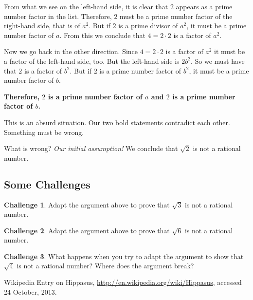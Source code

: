 \documentclass[12pt,letterpaper]{article}
\theoremstyle{definition}
\newtheorem*{challenge}{Challenge}
\begin{document}
From what we see on the left-hand side, it is clear that $2$ appears as a prime number factor in the list.
Therefore, $2$ must be a prime number factor of the right-hand side, that is of $a^2$.
But if $2$ is a prime divisor of $a^2$, it must be a prime number factor of $a$.
From this we conclude that $4 = 2\cdot 2$ is a factor of $a^2$.

Now we go back in the other direction.
Since $4 = 2\cdot 2$ is a factor of $a^2$ it must be a factor of the left-hand side, too.
But the left-hand side is $2 b^2$.
So we must have that $2$ is a factor of $b^2$.
But if $2$ is a prime number factor of $b^2$, it must be a prime number factor of $b$.

\textbf{Therefore, $2$ is a prime number factor of $a$ and $2$ is a prime number factor of $b$.}

This is an absurd situation.
Our two bold statements contradict each other.
Something must be wrong.

What is wrong?
\textit{Our initial assumption!}
We conclude that $\sqrt{2}$ is not a rational number.


\subsection*{Some Challenges}

\begin{challenge}
Adapt the argument above to prove that $\sqrt{3}$ is not a rational number.
\end{challenge}

\begin{challenge}
Adapt the argument above to prove that $\sqrt{6}$ is not a rational number.
\end{challenge}

\begin{challenge}
What happens when you try to adapt the argument to show that $\sqrt{4}$ is not a rational number?
Where does the argument break?
\end{challenge}


\begin{thebibliography}{9}

    Wikipedia Entry on Hippasus, 
    \url{http://en.wikipedia.org/wiki/Hippasus},
    accessed 24 October, 2013.

\end{thebibliography}
\end{document}
